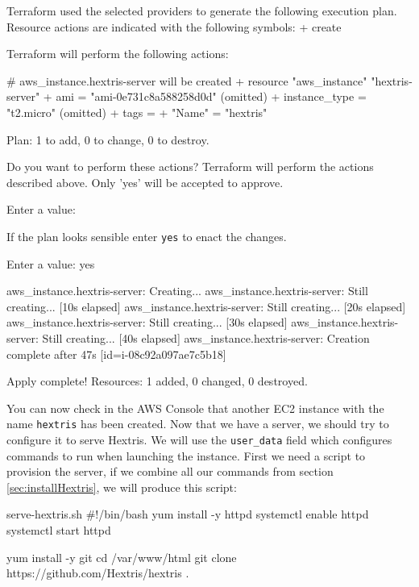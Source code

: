\documentclass{csse4400}
\begin{document}
\begin{code}[numbers=none]{}
Terraform used the selected providers to generate the following execution plan. Resource actions are indicated with the following symbols:
  + create

Terraform will perform the following actions:

  # aws_instance.hextris-server will be created
  + resource "aws_instance" "hextris-server" {
      + ami                                  = "ami-0e731c8a588258d0d"
      (omitted)
      + instance_type                        = "t2.micro"
      (omitted)
      + tags                                 = {
          + "Name" = "hextris"
        }
    }

Plan: 1 to add, 0 to change, 0 to destroy.

Do you want to perform these actions?
  Terraform will perform the actions described above.
  Only 'yes' will be accepted to approve.

  Enter a value: 
\end{code}

If the plan looks sensible enter \texttt{yes} to enact the changes.

\begin{code}[numbers=none]{}
  Enter a value: yes

aws_instance.hextris-server: Creating...
aws_instance.hextris-server: Still creating... [10s elapsed]
aws_instance.hextris-server: Still creating... [20s elapsed]
aws_instance.hextris-server: Still creating... [30s elapsed]
aws_instance.hextris-server: Still creating... [40s elapsed]
aws_instance.hextris-server: Creation complete after 47s [id=i-08c92a097ae7c5b18]

Apply complete! Resources: 1 added, 0 changed, 0 destroyed.
\end{code}

You can now check in the AWS Console that another EC2 instance with the name \texttt{hextris} has been created.
Now that we have a server, we should try to configure it to serve Hextris.
We will use the \texttt{user\_data} field which configures commands to run when launching the instance.
First we need a script to provision the server, if we combine all our commands from section \ref{sec:installHextris}, we will produce this script:

\begin{code}[language=bash,numbers=none]{serve-hextris.sh}
#!/bin/bash
yum install -y httpd
systemctl enable httpd
systemctl start httpd

yum install -y git
cd /var/www/html
git clone https://github.com/Hextris/hextris .  
\end{code}
\end{document}
